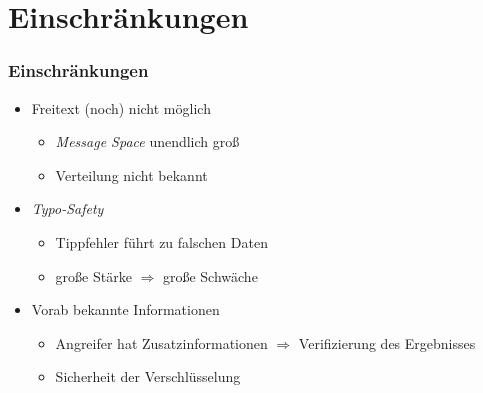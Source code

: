 \section{Einschränkungen}

\begin{frame}[t]
	\frametitle{Einschränkungen}
	
	\begin{itemize}
		\item Freitext (noch) nicht möglich
		\begin{itemize}
			\item \emph{Message Space} unendlich groß
			\item Verteilung nicht bekannt
		\end{itemize}
		\pause
		\item \emph{Typo-Safety}
		\begin{itemize}
			\item Tippfehler führt zu falschen Daten
			\item große Stärke $\Rightarrow$ große Schwäche
		\end{itemize}
		\pause
		\item Vorab bekannte Informationen
		\begin{itemize}
			\item Angreifer hat Zusatzinformationen $\Rightarrow$ Verifizierung des Ergebnisses
			\item Sicherheit der Verschlüsselung
		\end{itemize}
	\end{itemize}	
	
\end{frame}